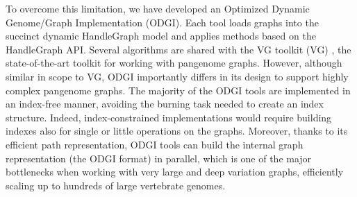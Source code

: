 \documentclass{bioinfo}
\begin{document}
    To overcome this limitation, we have developed an Optimized Dynamic Genome/Graph Implementation (ODGI). Each tool
    loads graphs into the succinct dynamic HandleGraph model \citep{33040146} and applies methods based on the
    HandleGraph API. Several algorithms are shared with the VG toolkit (VG) \citep{30125266}, the state-of-the-art
    toolkit for working with pangenome graphs. However, although similar in scope to VG, ODGI importantly differs in
    its design to support highly complex pangenome graphs. The majority of the ODGI tools are implemented in an
    index-free manner, avoiding the burning task needed to create an index structure. Indeed, index-constrained
    implementations would require building indexes also for single or little operations on the graphs. Moreover,
    thanks to its efficient path representation, ODGI tools can build the internal graph representation (the ODGI
    format) in parallel, which is one of the major bottlenecks when working with very large and deep variation graphs,
    efficiently scaling up to hundreds of large vertebrate genomes.

\end{document}
